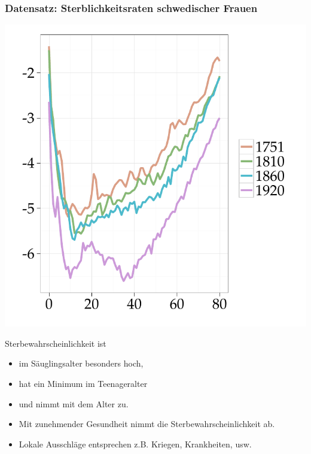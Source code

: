\documentclass[xcolor=dvipsnames, compress, serif, professionalfont, handout]{beamer}
\newenvironment{knitrout}{}{} %
\renewenvironment{knitrout}{\begin{footnotesize}}{\end{footnotesize}}
\begin{document}
%
%

\begin{frame}[fragile]
\frametitle{Datensatz: Sterblichkeitsraten schwedischer Frauen}


  \hspace{-0.1cm}   
  \begin{minipage}{0.48\textwidth}
\begin{knitrout}
\color{fgcolor}

{\centering \includegraphics[width=\linewidth,height=\linewidth]{figure/graphics-GR_bspmort} 

}


\end{knitrout}

  \end{minipage} 
  \hspace{0.1cm}
  \begin{minipage}{0.48\textwidth}
    Sterbewahrscheinlichkeit ist
    \begin{itemize}
      \item<1-> im S\"auglingsalter besonders hoch,
      \item<2-> hat ein Minimum im Teenageralter
      \item<3-> und nimmt mit dem Alter zu.
      \item<4-> Mit zunehmender Gesundheit nimmt die Sterbewahrscheinlichkeit ab.
      \item<5-> Lokale Ausschl\"age entsprechen z.B. Kriegen, Krankheiten, usw.
    \end{itemize}
  \end{minipage}
\end{frame}
\end{document}
